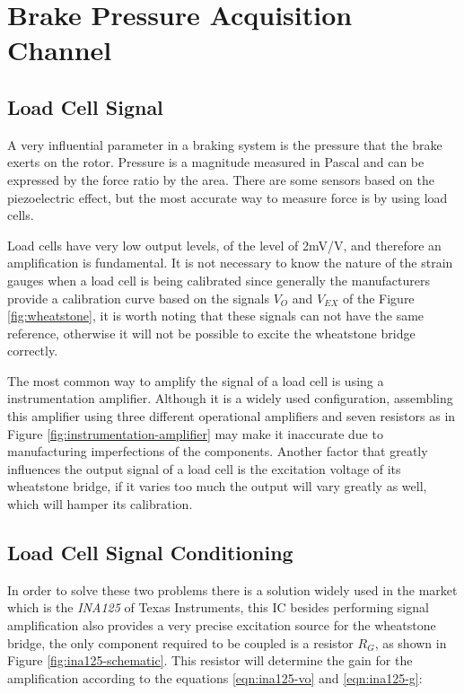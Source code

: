 \section{Brake Pressure Acquisition Channel}

\subsection{Load Cell Signal}

	A very influential parameter in a braking system is the pressure that the brake exerts on the rotor. Pressure is a magnitude measured in Pascal and can be expressed by the force ratio by the area. There are some sensors based on the piezoelectric effect, but the most accurate way to measure force is by using load cells.

	Load cells have very low output levels, of the level of 2mV/V, and therefore an amplification is fundamental. It is not necessary to know the nature of the strain gauges when a load cell is being calibrated since generally the manufacturers provide a calibration curve based on the signals $V_{O}$ and $V_{EX}$ of the Figure \ref{fig:wheatstone}, it is worth noting that these signals can not have the same reference, otherwise it will not be possible to excite the wheatstone bridge correctly. 

	The most common way to amplify the signal of a load cell is using a instrumentation amplifier. Although it is a widely used configuration, assembling this amplifier using three different operational amplifiers and seven resistors as in Figure \ref{fig:instrumentation-amplifier} may make it inaccurate due to manufacturing imperfections of the components. Another factor that greatly influences the output signal of a load cell is the excitation voltage of its wheatstone bridge, if it varies too much the output will vary greatly as well, which will hamper its calibration.

\subsection{Load Cell Signal Conditioning}
		
	In order to solve these two problems there is a solution widely used in the market which is the \textit{INA125} of Texas Instruments, this IC besides performing signal amplification also provides a very precise excitation source for the wheatstone bridge, the only component required to be coupled is a resistor $R_{G}$, as shown in Figure \ref{fig:ina125-schematic}. This resistor will determine the gain for the amplification according to the equations \ref{eqn:ina125-vo} and \ref{eqn:ina125-g}:
	

